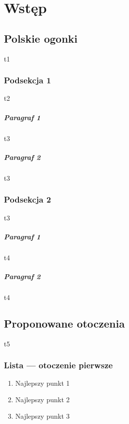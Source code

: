 \documentclass [a4paper, fleqn, 12pt] {mwrep}
\begin{document}
\maketitle
{}
\newpage
\tableofcontents

\newpage

\chapter{Wstęp}
\thispagestyle{empty}
\section {Polskie ogonki}
 {t1}
	\subsection {Podsekcja 1}
	 {t2}
		\paragraph {Paragraf 1}
		 {t3}
		\paragraph {Paragraf 2}
		 {t3}
	\subsection {Podsekcja 2}
	 {t3}
		\paragraph {Paragraf 1}
		 {t4}
		\paragraph {Paragraf 2}
		 {t4}


\section {Proponowane otoczenia}
 {t5}
	\subsection {Lista --- otoczenie pierwsze}
		\begin {enumerate}
			\item {Najlepszy punkt 1}
			\item {Najlepszy punkt 2}
			\item {Najlepszy punkt 3}
		\end {enumerate}
\end{document}

